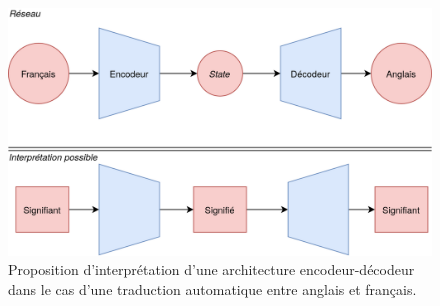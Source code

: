 \begin{figure}[h]
    \centering
    \includegraphics[width=\linewidth]{figures/chap2/EncodeurDecodeur.png}
    \caption{Proposition d'interprétation d'une architecture encodeur-décodeur dans le cas d'une traduction automatique entre anglais et français.}
    \label{fig:deep-learning:encoder-decoder}
\end{figure}

